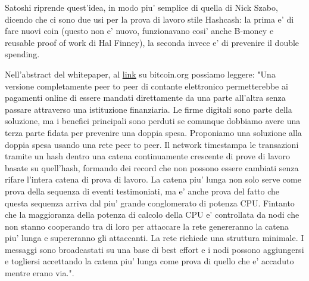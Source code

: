 \documentclass{article}
\begin{document}
Satoshi riprende quest'idea, in modo piu' semplice di quella di Nick Szabo, dicendo che ci sono due usi per la prova di lavoro stile Hashcash: la prima e' di fare nuovi coin (questo non e' nuovo, funzionavano cosi' anche B-money e reusable proof of work di Hal Finney), la seconda invece e' di prevenire il double spending.

Nell'abstract del whitepaper, al \href{https://bitcoin.org/bitcoin.pdf}{link} su bitcoin.org possiamo leggere: "Una versione completamente peer to peer di contante elettronico permetterebbe ai pagamenti online di essere mandati direttamente da una parte all'altra senza passare attraverso una istituzione finanziaria. Le firme digitali sono parte della soluzione, ma i benefici principali sono perduti se comunque dobbiamo avere una terza parte fidata per prevenire una doppia spesa. Proponiamo una soluzione alla doppia spesa usando una rete peer to peer. Il network timestampa le transazioni tramite un hash dentro una catena continuamente crescente di prove di lavoro basate su quell'hash, formando dei record che non possono essere cambiati senza rifare l'intera catena di prova di lavoro. La catena piu' lunga non solo serve come prova della sequenza di eventi testimoniati, ma e' anche prova del fatto che questa sequenza arriva dal piu' grande conglomerato di potenza CPU. Fintanto che la maggioranza della potenza di calcolo della CPU e' controllata da nodi che non stanno cooperando tra di loro per attaccare la rete genereranno la catena piu' lunga e supereranno gli attaccanti. La rete richiede una struttura minimale. I messaggi sono broadcastati su una base di best effort e i nodi possono aggiungersi e togliersi accettando la catena piu' lunga come prova di quello che e' accaduto mentre erano via.".
\end{document}
